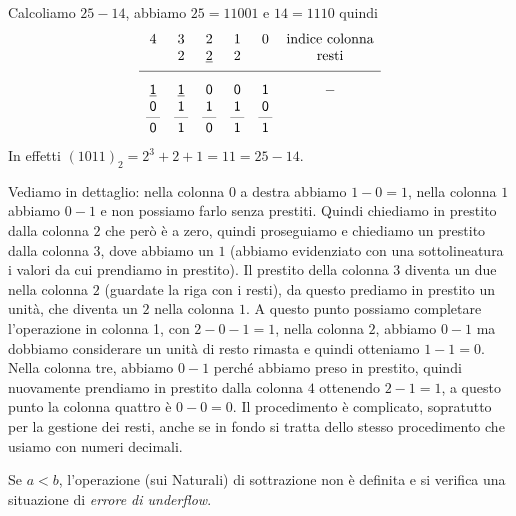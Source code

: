 \begin{ex}
Calcoliamo $25-14$, abbiamo $25 = 11001$ e $14 = 1110$ quindi 
\[
\begin{matrix}
 4 & 3 &   2   & 1 & 0 & \text{indice colonna}\\
   & 2  & \underline{2} & 2 &   & \text{resti}\\[1ex]
\hline\\[-1ex]
 \underline{\mathsf 1} & \underline{\mathsf 1} & \mathsf 0  & \mathsf 0 & \mathsf 1 & \mathsf-\\
 \mathsf 0 & \mathsf 1 & \mathsf 1  & \mathsf 1 & \mathsf 0 & \\[-1ex]
\text{---}&\text{---}&\text{---}&\text{---}&\text{---}& \\[-1ex]
 \mathsf 0 & \mathsf 1 & \mathsf 0 & \mathsf 1 & \mathsf 1 &
\end{matrix}
\]
In effetti $(1011)_2 = 2^3+2+1 = 11 = 25-14$.
\end{ex}

Vediamo in dettaglio: nella colonna $0$ a destra abbiamo $1-0 = 1$,
nella colonna $1$ abbiamo $0-1$ e non possiamo farlo senza prestiti.
Quindi chiediamo in prestito dalla colonna $2$ che però è a zero, quindi proseguiamo e chiediamo un prestito dalla colonna $3$, dove abbiamo un $1$ (abbiamo evidenziato con una sottolineatura i valori da cui prendiamo in prestito).
Il prestito della colonna $3$ diventa un due nella colonna $2$ (guardate la riga con i resti), da questo prediamo in prestito un unità, che diventa un $2$ nella colonna $1$.
A questo punto possiamo completare l'operazione in colonna 1, con $2-0-1 = 1$,
nella colonna $2$, abbiamo $0 - 1$ ma dobbiamo considerare un unità di resto rimasta e quindi otteniamo $1 - 1 = 0$. Nella colonna tre, abbiamo $0-1$ perché abbiamo preso in prestito, quindi nuovamente prendiamo in prestito dalla colonna $4$ ottenendo $2-1 = 1$, a questo punto la colonna quattro è $0-0=0$.
Il procedimento è complicato, sopratutto per la gestione dei resti, anche se in fondo si tratta dello stesso procedimento che usiamo con numeri decimali.

Se $a < b$, l'operazione (sui Naturali) di sottrazione non è definita e si verifica una situazione di \emph{errore di underflow}.

